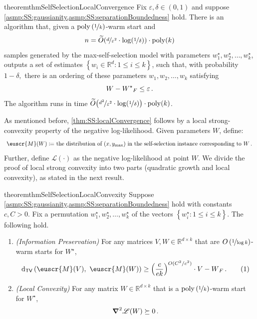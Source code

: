 \documentclass[11pt,letterpaper]{article}
\theoremstyle{plain}
\theoremstyle{definition}
\theoremstyle{remark}
\newcommand{\yesnum}{\addtocounter{equation}{1}\tag{\theequation}}
\newcommand{\inbrace}[1]{\ensuremath{\left\{#1\right\}}}
\newcommand{\inparen}[1]{\ensuremath{\left(#1\right)}}
\let\norm\relax
\newcommand{\norm}[1]{\ensuremath{\left\lVert #1 \right\rVert}}
\newcommand{\R}{\mathbb{R}}
\newcommand{\tv}[2]{\operatorname{d}_{\mathsf{TV}}{\inparen{#1,#2}}}
\newcommand{\nfrac}[2]{\nicefrac{#1}{#2}}
\newcommand{\poly}{\mathrm{poly}}
\newcommand{\eps}{\varepsilon}
\renewcommand{\tilde}{\widetilde}
\newcommand{\customcal}[1]{\euscr{#1}}
\newcommand{\cL}{\customcal{L}}
\newcommand{\cM}{\customcal{M}}
\newcommand{\negLL}{\ensuremath{\mathscr{L}}}
\newcommand{\Wstar}{{W^\star}}
\renewcommand{\cL}{\negLL}
\begin{document}
{\begin{restatable}{theorem}{thmSelfSelectionLocalConvergence}
            Fix $\eps,\delta\in (0,1)$ and 
            suppose \cref{asmp:SS:gaussianity,asmp:SS:separationBoundedness} hold.
            There is an algorithm that, given 
                a $\poly\inparen{\nfrac{1}{k}}$-warm start
                and
                \[n=\tilde O{\inparen{\nfrac{d}{\eps^2}\cdot {\log(\nicefrac1\delta)}}}\cdot \poly(k)\] 
                samples generated by the max-self-selection model with parameters $w^\star_1,w^\star_2,\dots,w^\star_k$,
            outputs a set of estimates $\inbrace{w_i\in \R^d\colon 1\leq i\leq k}$,
            such that,  with probability $1-\delta,$ there is an ordering of these parameters $w_1,w_2,\dots,w_k$ satisfying 
            \[
                \norm{W - \Wstar}_F\leq \eps\,.
            \]
            The algorithm runs in time \mbox{$\tilde O{\inparen{\nfrac{d^2}{\eps^2}\cdot {\log(\nicefrac1\delta)}}}\cdot \poly(k)$}.
        \end{restatable}
        As mentioned before, \cref{thm:SS:localConvergence} follows by a local strong-convexity property of the negative log-likelihood. 
        Given parameters $W$, define:
        \[
            \text{
                $\cM(W)\coloneqq$ the distribution of {$(x,y_{\max})$} in the self-selection instance corresponding to $W$\,.
            }
        \]
        Further, define $\cL(\cdot)$ as the negative log-likelihood at point $W$.
        We divide the proof of local strong convexity into two parts (quadratic growth and local convexity), as stated in the next result.
        \begin{restatable}{theorem}{thmSelfSelectionLocalConvexity} 
            \label{thm:SS:localConvexity}
            Suppose \cref{asmp:SS:gaussianity,asmp:SS:separationBoundedness} hold with constants $c,C>0$.
            Fix a permutation $w_1^\star,w_2^\star,\dots,w_k^\star$ of the vectors $\inbrace{w_i^\star:1\leq i\leq k}$.
            The following hold. 
            \begin{enumerate}[leftmargin=15pt]
                \item \textit{(Information Preservation)}
                    For any matrices $V,W\in \R^{d\times k}$ that are $O\inparen{\nfrac{1}{\log{k}}}$-warm starts for $\Wstar$, 
                    \[
                        \tv{\cM(V)}{~\cM(W)} \geq 
                        \inparen{\frac{c}{ek}}^{{O({C^2/c^2}){}}}
                        \cdot \norm{V - W}_F\,.
                        \yesnum\label{eq:SS:informationPreservation}
                    \]
                \item \textit{(Local Convexity)} For any matrix $W\in \R^{d\times k}$ that is a $\poly\inparen{\nfrac{1}{k}}$-warm start for $\Wstar$, 
                    \[
                        \grad^2 \cL(W) \succeq 0\,.
                    \]
            \end{enumerate}
            

\end{restatable}}
\end{document}
